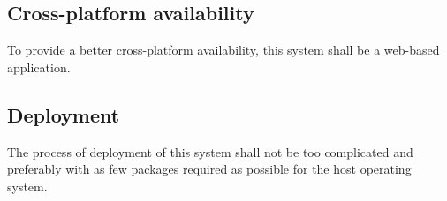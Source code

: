 \subsection{Cross-platform availability}
To provide a better cross-platform availability, this system shall be a
web-based application.

\subsection{Deployment}
The process of deployment of this system shall not be too complicated and
preferably with as few packages required as possible for the host operating
system.